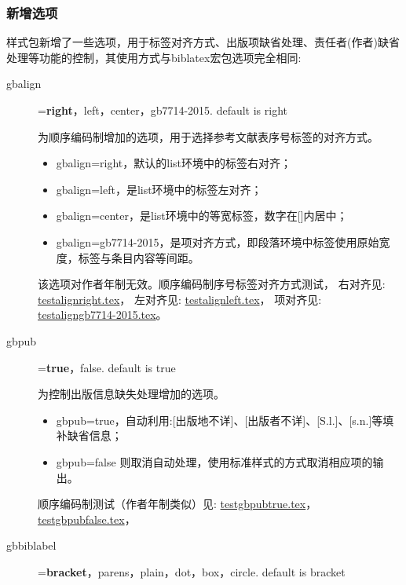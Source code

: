 \subsubsection{新增选项}\label{sec:added:opt}
样式包新增了一些选项，用于标签对齐方式、出版项缺省处理、责任者(作者)缺省处理等功能的控制，其使用方式与biblatex宏包选项完全相同:
\begin{description}
  \item[gbalign]=\textbf{right}，left，center，gb7714-2015. \hfill default is right

  为顺序编码制增加的选项，用于选择参考文献表序号标签的对齐方式。
  \begin{itemize}
    \item gbalign=right，默认的list环境中的标签右对齐；
    \item gbalign=left，是list环境中的标签左对齐；
    \item gbalign=center，是list环境中的等宽标签，数字在[]内居中；
    \item gbalign=gb7714-2015，是项对齐方式，即段落环境中标签使用原始宽度，标签与条目内容等间距。
  \end{itemize}
  该选项对作者年制无效。顺序编码制序号标签对齐方式测试，
  右对齐见:
  \href{run:./example/testalignright.tex}{testalignright.tex}，
  左对齐见:
  \href{run:./example/testalignleft.tex}{testalignleft.tex}，
  项对齐见:
  \href{run:./example/testaligngb7714-2015.tex}{testaligngb7714-2015.tex}。

  \item[gbpub]=\textbf{true}，false. \hfill default is true

  为控制出版信息缺失处理增加的选项。
  \begin{itemize}
    \item gbpub=true，自动利用:[出版地不详]、[出版者不详]、[S.l.]、[s.n.]等填补缺省信息；
    \item gbpub=false 则取消自动处理，使用标准样式的方式取消相应项的输出。
  \end{itemize}
  顺序编码制测试（作者年制类似）见:
  \href{run:./example/testgbpubtrue.tex}{testgbpubtrue.tex}，
  \href{run:./example/testgbpubfalse.tex}{testgbpubfalse.tex}，

  \item[gbbiblabel]=\textbf{bracket}，parens，plain，dot，box，circle. \hfill default is bracket


\end{description}
